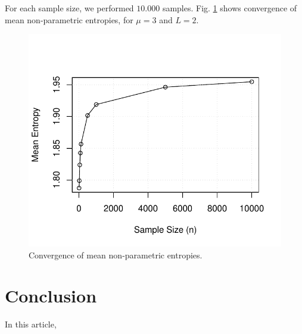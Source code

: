 \documentclass[conference]{IEEEtran}
\begin{document}
For each sample size, we performed $10.000$ samples. Fig. \ref{F4} shows convergence of mean non-parametric entropies, for $\mu=3$ and $L=2$.

%
\begin{figure}[H] 
\centering
	\includegraphics[scale=0.5]{../../../Figures/PDF/mean_entropies1}\vspace{-1.5mm} 
	\caption{Convergence of mean non-parametric entropies.}
	\label{F4}
\end{figure}
\section{Conclusion}\label{sec_09}

In this article, 


%


\end{document}
